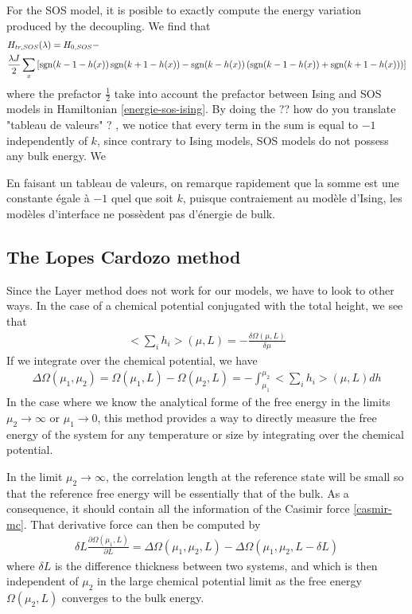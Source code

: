 For the SOS model, it is posible to exactly compute the energy variation produced by the decoupling. We find that
\begin{align}
    &H_{tr,SOS}(\lambda) = H_{0,SOS} - \nonumber \\
     &\frac{\lambda J}{2} \sum_x \left[ \operatorname{sgn}(k-1-h(x)) \operatorname{sgn}(k+1-h(x)) - \operatorname{sgn}(k-h(x)) \left( \operatorname{sgn}(k-1-h(x))+\operatorname{sgn}(k+1-h(x)) \right) \right]
\end{align}
where the prefactor $\frac{1}{2}$ take into account the prefactor between Ising and SOS models in Hamiltonian \eqref{energie-sos-ising}. By doing the ?? {\color{red} how do you translate "tableau de valeurs" ? } , we notice that every term in the sum is equal to $-1$ independently of $k$, since contrary to Ising models, SOS models do not possess any bulk energy. We 

En faisant un tableau de valeurs, on remarque rapidement que la somme est une constante égale à $-1$ quel que soit $k$, puisque contraiement au modèle d'Ising, les modèles d'interface ne possèdent pas d'énergie de bulk.

    \subsection{The Lopes Cardozo method}
Since the Layer method does not work for our models, we have to look to other ways. In the case of a chemical potential conjugated with the total height, we see that \cite{lopes_cardozo_critical_2014}
\begin{align}
    <\sum_i h_i>(\mu,L) = - \frac{\delta \Omega(\mu,L)}{\delta \mu}
\end{align} 
If we integrate over the chemical potential, we have
\begin{align}
    \Delta \Omega(\mu_1,\mu_2)  = \Omega(\mu_1,L) - \Omega(\mu_2,L) = - \int_{\mu_1}^{\mu_2} <\sum_i h_i>(\mu,L) dh
    \label{integration-cardozo}
\end{align}
In the case where we know the analytical forme of the free energy in the limits $\mu_2 \to \infty$ or $\mu_1 \to 0$, this method provides a way to directly measure the free energy of the system for any temperature or size  by integrating over the chemical potential.

In the limit $\mu_2 \to \infty$, the correlation length at the reference state will be small so that the reference free energy will be essentially that of the bulk. As a consequence, it should contain all the information of the Casimir force \eqref{casmir-mc}. That derivative force can then be computed by 
\begin{align}
    \delta L \frac{\partial \Omega(\mu_1,L)}{\partial L} = \Delta \Omega(\mu_1,\mu_2,L)-\Delta \Omega(\mu_1,\mu_2,L-\delta L)
\end{align}
where $\delta L$ is the difference thickness between two systems, and which is then independent of $\mu_2$ in the large chemical potential limit as the free energy $\Omega(\mu_2,L)$ converges to the bulk energy.

